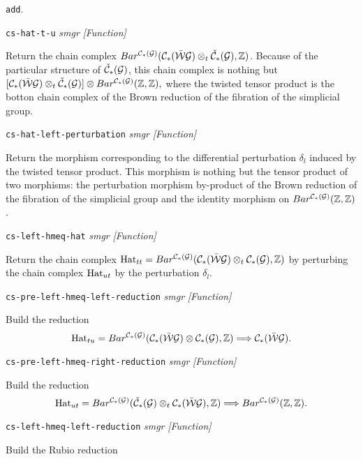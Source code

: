 {{{\tt add}. \par}
{\leftskip=5mm
{\tt cs-hat-t-u} {\em smgr}  \hfill {\em [Function]} \par}
{\leftskip=15mm
Return the chain complex
$Bar^{{\cal C}_*({\cal G})}({\cal C}_*(\bar{\cal W}{\cal G})\otimes_t {\check{\cal C}}_*({\cal G}),{{\Bbb Z}})$. Because of
the particular structure of ${\check{\cal C}}_*({\cal G})$, this chain complex is nothing but
$[{\cal C}_*(\bar{\cal W}{\cal G})\otimes_t {\check{\cal C}}_*({\cal G})]\otimes Bar^{{\cal C}_*({\cal G})}({{\Bbb Z}},{{\Bbb Z}}),$
where the twisted tensor product is the botton chain complex of the Brown reduction
of the fibration of the simplicial group. \par}
{\leftskip=5mm
{\tt cs-hat-left-perturbation} {\em smgr}  \hfill {\em [Function]} \par}
{\leftskip=15mm
Return the morphism corresponding to the differential perturbation $\delta_l$ induced
by the twisted tensor product. This morphism is nothing but the tensor product of two
morphisms: the perturbation morphism by-product of the Brown reduction of the fibration of
the simplicial group and the identity morphism on $Bar^{{\cal C}_*({\cal G})}({{\Bbb Z}},{{\Bbb Z}})$. \par}
{\leftskip=5mm
{\tt cs-left-hmeq-hat} {\em smgr}  \hfill {\em [Function]} \par}
{\leftskip=15mm
Return the chain complex 
${\rm Hat}_{tt}=Bar^{{\cal C}_*({\cal G})}({\cal C}_*(\bar{\cal W}{\cal G})\otimes_t {\cal C}_*({\cal G}),{{\Bbb Z}})$ by 
perturbing the chain complex ${\rm Hat}_{ut}$ by the perturbation $\delta_l$. \par}
{\leftskip=5mm
{\tt cs-pre-left-hmeq-left-reduction} {\em smgr}  \hfill {\em [Function]} \par}
{\leftskip=15mm
Build the reduction
$${\rm Hat}_{tu}=Bar^{{\cal C}_*({\cal G})}({\cal C}_*(\bar{\cal W}{\cal G})\otimes {\cal C}_*({\cal G}),{{\Bbb Z}}) \Longrightarrow {\cal C}_*(\bar{\cal W}{\cal G}).$$ 
\par}
{\leftskip=5mm
{\tt cs-pre-left-hmeq-right-reduction} {\em smgr}  \hfill {\em [Function]} \par}
{\leftskip=15mm
Build the reduction
$${\rm Hat}_{ut}=Bar^{{\cal C}_*({\cal G})}({\check{\cal C}}_*({\cal G})\otimes_t {\cal C}_*(\bar{\cal W}{\cal G}),{{\Bbb Z}}) \Longrightarrow
Bar^{{\cal C}_*({\cal G})}({{\Bbb Z}}, {{\Bbb Z}}).$$ \par}
{\leftskip=5mm
{\tt cs-left-hmeq-left-reduction} {\em smgr}  \hfill {\em [Function]} \par}
{\leftskip=15mm
Build the Rubio reduction 
}}
